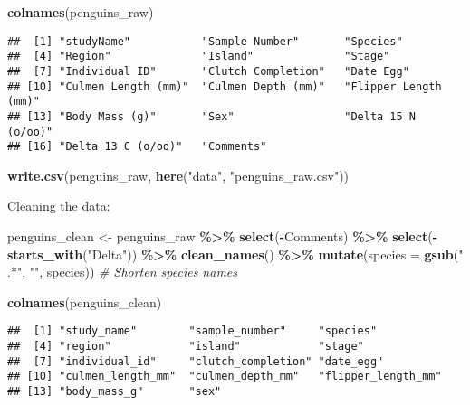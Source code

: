 \documentclass[
]{article}
\newenvironment{Shaded}{\begin{snugshade}}{\end{snugshade}}
\newcommand{\AttributeTok}[1]{\textcolor[rgb]{0.13,0.29,0.53}{#1}}
\newcommand{\CommentTok}[1]{\textcolor[rgb]{0.56,0.35,0.01}{\textit{#1}}}
\newcommand{\FunctionTok}[1]{\textcolor[rgb]{0.13,0.29,0.53}{\textbf{#1}}}
\newcommand{\NormalTok}[1]{#1}
\newcommand{\OtherTok}[1]{\textcolor[rgb]{0.56,0.35,0.01}{#1}}
\newcommand{\SpecialCharTok}[1]{\textcolor[rgb]{0.81,0.36,0.00}{\textbf{#1}}}
\newcommand{\StringTok}[1]{\textcolor[rgb]{0.31,0.60,0.02}{#1}}
\begin{document}
\begin{Shaded}
\begin{Highlighting}[]
\FunctionTok{colnames}\NormalTok{(penguins\_raw)}
\end{Highlighting}
\end{Shaded}

\begin{verbatim}
##  [1] "studyName"           "Sample Number"       "Species"            
##  [4] "Region"              "Island"              "Stage"              
##  [7] "Individual ID"       "Clutch Completion"   "Date Egg"           
## [10] "Culmen Length (mm)"  "Culmen Depth (mm)"   "Flipper Length (mm)"
## [13] "Body Mass (g)"       "Sex"                 "Delta 15 N (o/oo)"  
## [16] "Delta 13 C (o/oo)"   "Comments"
\end{verbatim}

\begin{Shaded}
\begin{Highlighting}[]
\FunctionTok{write.csv}\NormalTok{(penguins\_raw, }\FunctionTok{here}\NormalTok{(}\StringTok{"data"}\NormalTok{, }\StringTok{"penguins\_raw.csv"}\NormalTok{))}
\end{Highlighting}
\end{Shaded}

Cleaning the data:

\begin{Shaded}
\begin{Highlighting}[]
\NormalTok{penguins\_clean }\OtherTok{\textless{}{-}}\NormalTok{ penguins\_raw }\SpecialCharTok{\%\textgreater{}\%}
\FunctionTok{select}\NormalTok{(}\SpecialCharTok{{-}}\NormalTok{Comments) }\SpecialCharTok{\%\textgreater{}\%}
\FunctionTok{select}\NormalTok{(}\SpecialCharTok{{-}}\FunctionTok{starts\_with}\NormalTok{(}\StringTok{"Delta"}\NormalTok{)) }\SpecialCharTok{\%\textgreater{}\%}
\FunctionTok{clean\_names}\NormalTok{() }\SpecialCharTok{\%\textgreater{}\%}
\FunctionTok{mutate}\NormalTok{(}\AttributeTok{species =} \FunctionTok{gsub}\NormalTok{(}\StringTok{" .*"}\NormalTok{, }\StringTok{""}\NormalTok{, species))  }\CommentTok{\# Shorten species names}

\FunctionTok{colnames}\NormalTok{(penguins\_clean)}
\end{Highlighting}
\end{Shaded}

\begin{verbatim}
##  [1] "study_name"        "sample_number"     "species"          
##  [4] "region"            "island"            "stage"            
##  [7] "individual_id"     "clutch_completion" "date_egg"         
## [10] "culmen_length_mm"  "culmen_depth_mm"   "flipper_length_mm"
## [13] "body_mass_g"       "sex"
\end{verbatim}
\end{document}
